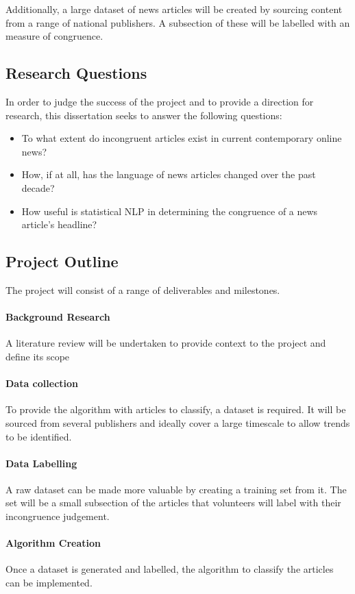 Additionally, a large dataset of news articles will be created by sourcing content from a range of national publishers. A subsection of these will be labelled with an measure of congruence.

\subsection{Research Questions}\label{int:qs}
In order to judge the success of the project and to provide a direction for research, this dissertation seeks to answer the following questions:
\begin{itemize}
	\item To what extent do incongruent articles exist in current contemporary online news?
	\item How, if at all, has the language of news articles changed over the past decade?
	\item How useful is statistical NLP in determining the congruence of a news article's headline?
\end{itemize}

\subsection{Project Outline}
The project will consist of a range of deliverables and milestones.
 
\paragraph{Background Research}
A literature review will be undertaken to provide context to the project and define its scope

\paragraph{Data collection}
To provide the algorithm with articles to classify, a dataset is required. It will be sourced from several publishers and ideally cover a large timescale to allow trends to be identified.

\paragraph{Data Labelling}
A raw dataset can be made more valuable by creating a training set from it. The set will be a small subsection of the articles that volunteers will label with their incongruence judgement.

\paragraph{Algorithm Creation}
Once a dataset is generated and labelled, the algorithm to classify the articles can be implemented. 

